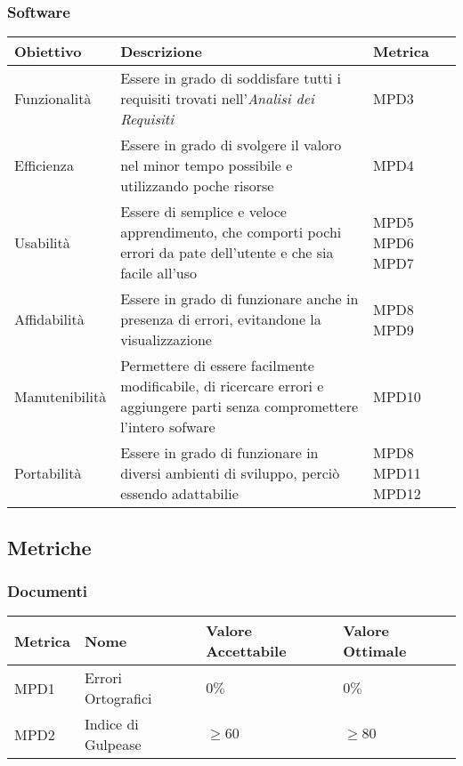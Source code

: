 \subsubsection{Software}
\begin{center}
  \begin{tabular}{|p{2.5cm}|p{8cm}|p{1.5cm}|} \hline
    \textbf{Obiettivo} & \textbf{Descrizione} & \textbf{Metrica}  \\ \hline
    Funzionalità & Essere in grado di soddisfare tutti i requisiti trovati nell'\textit{Analisi dei Requisiti}  & MPD3       \\ \hline
    Efficienza & Essere in grado di svolgere il valoro nel minor tempo possibile e utilizzando poche risorse   & MPD4       \\ \hline
    Usabilità & Essere di semplice e veloce apprendimento, che comporti pochi errori da pate dell'utente e che sia facile all'uso  & MPD5 \newline MPD6 \newline MPD7    \\ \hline
    Affidabilità & Essere in grado di funzionare anche in presenza di errori, evitandone la visualizzazione  & MPD8 \newline MPD9       \\ \hline
    Manutenibilità & Permettere di essere facilmente modificabile, di ricercare errori e aggiungere parti senza compromettere l'intero sofware  & MPD10       \\ \hline
    Portabilità & Essere in grado di funzionare in diversi ambienti di sviluppo, perciò essendo adattabilie & MPD8 \newline MPD11 \newline MPD12       \\ \hline
  \end{tabular}
\end{center}


\subsection{Metriche}
\subsubsection{Documenti}
\begin{center}
  \begin{tabular}{|p{2cm}|p{4cm}|p{4cm}|p{3.5cm}|} \hline
    \textbf{Metrica} & \textbf{Nome} & \textbf{Valore Accettabile} & \textbf{Valore Ottimale}    \\ \hline
      MPD1 & Errori Ortografici    & $0\%$      & $0\%$        \\ \hline
      MPD2 & Indice di Gulpease    & $\geq60$   & $\geq80$     \\ \hline
  \end{tabular}
\end{center}
